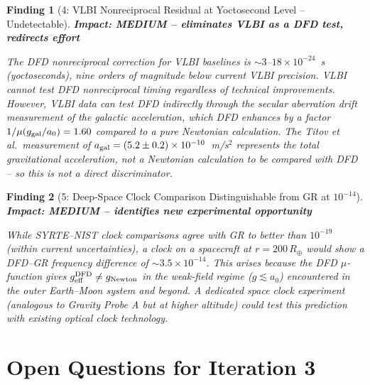 \documentclass[aps,prd,twocolumn,superscriptaddress,nofootinbib]{revtex4-2}
\newtheorem{finding}{Finding}
\begin{document}
\begin{finding}[4: VLBI Nonreciprocal Residual at Yoctosecond Level -- Undetectable]
\label{find:4}
\textbf{Impact: MEDIUM -- eliminates VLBI as a DFD test, redirects effort}

The DFD nonreciprocal correction for VLBI baselines is
$\sim 3$--$18\times10^{-24}$~s (yoctoseconds), nine orders of magnitude
below current VLBI precision. VLBI cannot test DFD nonreciprocal timing
regardless of technical improvements. However, VLBI data \emph{can} test
DFD indirectly through the secular aberration drift measurement of the
galactic acceleration, which DFD enhances by a factor $1/\mu(g_{\rm gal}/a_0) = 1.60$
compared to a pure Newtonian calculation. The Titov et al.\ measurement
of $a_{\rm gal} = (5.2\pm0.2)\times10^{-10}$~m/s$^2$ represents
the \emph{total} gravitational acceleration, not a Newtonian calculation
to be compared with DFD -- so this is not a direct discriminator.
\end{finding}

\begin{finding}[5: Deep-Space Clock Comparison Distinguishable from GR at $10^{-14}$]
\label{find:5}
\textbf{Impact: MEDIUM -- identifies new experimental opportunity}

While SYRTE--NIST clock comparisons agree with GR to better than
$10^{-19}$ (within current uncertainties), a clock on a spacecraft
at $r = 200\,R_\oplus$ would show a DFD--GR frequency difference
of $\sim 3.5\times10^{-14}$. This arises because the DFD $\mu$-function
gives $g_{\rm eff}^{\rm DFD} \neq g_{\rm Newton}$ in the weak-field
regime ($g \lesssim a_0$) encountered in the outer Earth--Moon system
and beyond. A dedicated space clock experiment (analogous to Gravity
Probe A but at higher altitude) could test this prediction with
existing optical clock technology.
\end{finding}

\section{Open Questions for Iteration 3}
\end{document}
